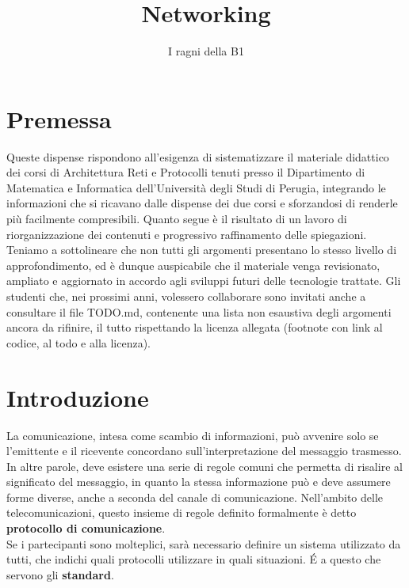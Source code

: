 \documentclass[a4paper,11pt]{article}
\title{Networking}
\author{I ragni della B1}
\begin{document}
\maketitle
\newpage
\tableofcontents
\newpage
\section*{Premessa}
Queste dispense rispondono all'esigenza di sistematizzare il materiale didattico dei corsi di Architettura Reti e Protocolli 
tenuti presso il Dipartimento di Matematica e Informatica dell'Università degli Studi di Perugia, integrando le 
informazioni che si ricavano dalle dispense dei due corsi e sforzandosi di renderle più facilmente compresibili. Quanto segue è 
il risultato di un lavoro di riorganizzazione dei contenuti e progressivo raffinamento delle spiegazioni. Teniamo a 
sottolineare che non tutti gli argomenti presentano lo stesso livello di approfondimento, ed è dunque auspicabile che il 
materiale venga revisionato, ampliato e aggiornato in accordo agli sviluppi futuri delle tecnologie trattate. Gli studenti che, 
nei prossimi anni, volessero collaborare sono invitati anche a consultare il file TODO.md, contenente una lista non esaustiva 
degli argomenti ancora da rifinire, il tutto rispettando la licenza allegata (footnote con link al codice, al todo e alla 
licenza).
 
\section{Introduzione}
La comunicazione, intesa come scambio di informazioni, può avvenire solo se l'emittente e il ricevente concordano sull'interpretazione del messaggio trasmesso. In altre parole, deve esistere una serie di regole comuni che permetta di risalire al significato del messaggio, in quanto la stessa informazione può e deve assumere forme diverse, anche a seconda del canale di comunicazione.
Nell'ambito delle telecomunicazioni, questo insieme di regole definito formalmente è detto \textbf{protocollo di comunicazione}. \\Se i partecipanti sono molteplici, sarà necessario definire un sistema utilizzato da tutti, che indichi quali protocolli utilizzare in quali situazioni. \'E a questo che servono gli \textbf{standard}.
\end{document}
